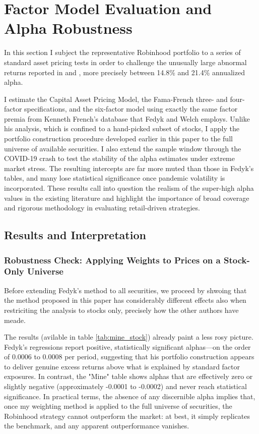 \section{Factor Model Evaluation and Alpha Robustness}
\label{sec:factor_models}
In this section I subject the representative Robinhood portfolio to a series of standard asset pricing tests in order to challenge the unusually large abnormal returns reported in \cite{Fedyk2024} and \cite{Welch2022}, 
more precisely between 14.8\% and 21.4\% annualized alpha.  

I estimate the Capital Asset Pricing Model, the Fama-French three- and four-factor specifications, and the six-factor model using exactly the same factor premia from Kenneth French's database that Fedyk and Welch employs.  
Unlike his analysis, which is confined to a hand-picked subset of stocks, I apply the portfolio construction procedure developed earlier in this paper to the full universe of available securities.  
I also extend the sample window through the COVID-19 crash to test the stability of the alpha estimates under extreme market stress.  
The resulting intercepts are far more muted than those in Fedyk's tables, and many lose statistical significance once pandemic volatility is incorporated.  
These results call into question the realism of the super-high alpha values in the existing literature and highlight the importance of broad coverage and rigorous methodology in evaluating retail-driven strategies.  

\subsection{Results and Interpretation}
\subsubsection{Robustness Check: Applying Weights to Prices on a Stock-Only Universe}
Before extending Fedyk's method to all securities, we proceed by shwoing that the method proposed in this paper has considerably different effects also when restriciting the analysis to stocks only, 
precisely how the other authors have meade.

The results (avilable in table \ref{tab:mine_stock}) already paint a less rosy picture.
Fedyk's regressions report positive, statistically significant alphas—on the order of 0.0006 to 0.0008 per period, suggesting that his portfolio construction appears to deliver genuine excess returns above what is explained by standard factor exposures. 
In contrast, the "Mine" table shows alphas that are effectively zero or slightly negative (approximately -0.0001 to -0.0002) and never reach statistical significance. 
In practical terms, the absence of any discernible alpha implies that, once my weighting method is applied to the full universe of securities, the Robinhood strategy cannot outperform the market: at best, it simply replicates the benchmark, and any apparent outperformance vanishes.

